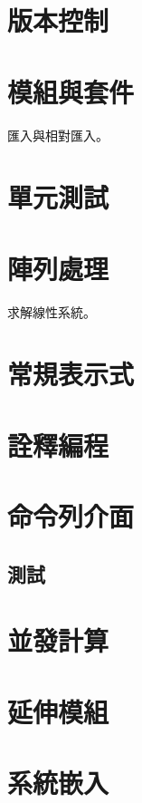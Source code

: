 \documentclass[a4paper,12pt]{book}
\theoremstyle{definition}
\begin{document}
\chapter{版本控制}
%
\label{c:version}

\chapter{模組與套件}
%
\label{c:module}

匯入與相對匯入。

\chapter{單元測試}
%
\label{c:unittest}

\chapter{陣列處理}
%
\label{c:array}

求解線性系統。

\chapter{常規表示式}
%
\label{c:regexp}

\chapter{詮釋編程}
%
\label{c:meta}

\chapter{命令列介面}
%
\label{c:cmdline}

\section{測試}

\chapter{並發計算}
%
\label{c:concurrency}

\chapter{延伸模組}
%
\label{c:extension}

\chapter{系統嵌入}
%
\label{c:embed}

\backmatter



\end{document}
